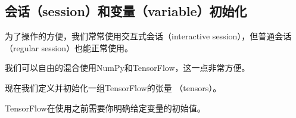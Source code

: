 \subsection{会话（session）和变量（variable）初始化
}\label{ux4f1aux8bddsessionux548cux53d8ux91cfvariableux521dux59cbux5316}

为了操作的方便，我们常常使用交互式会话（interactive
session），但普通会话（regular session）也能正常使用。

\begin{Shaded}
\begin{Highlighting}[]
   \OperatorTok{=} 
\end{Highlighting}
\end{Shaded}

我们可以自由的混合使用NumPy和TensorFlow，这一点非常方便。

\begin{Shaded}
\begin{Highlighting}[]

\OperatorTok{=} \NormalTok{np.mgrid[}\OperatorTok{-}\NormalTok{:}\NormalTok{:}\NormalTok{, }\OperatorTok{-}\NormalTok{:}\NormalTok{:}\NormalTok{]}
\OperatorTok{=} \OperatorTok{+}\OperatorTok{*}
\end{Highlighting}
\end{Shaded}

现在我们定义并初始化一组TensorFlow的张量 （tensors）。

\begin{Shaded}
\begin{Highlighting}[]
\OperatorTok{=} \NormalTok{))}
\OperatorTok{=} 
\OperatorTok{=} \NormalTok{))}
\end{Highlighting}
\end{Shaded}

TensorFlow在使用之前需要你明确给定变量的初始值。

\begin{Shaded}
\begin{Highlighting}[]
\end{Highlighting}
\end{Shaded}

